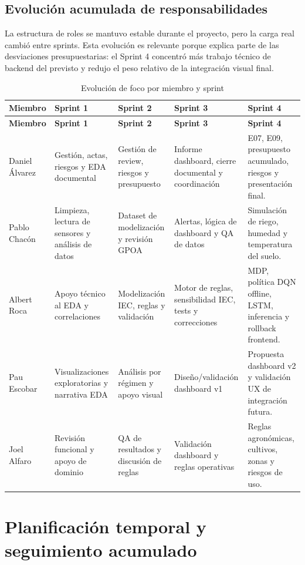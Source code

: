 \documentclass[11pt,a4paper]{article}
\begin{document}
\subsection{Evolución acumulada de responsabilidades}

La estructura de roles se mantuvo estable durante el proyecto, pero la carga real cambió entre sprints. Esta evolución es relevante porque explica parte de las desviaciones presupuestarias: el Sprint 4 concentró más trabajo técnico de backend del previsto y redujo el peso relativo de la integración visual final.

\begin{longtable}{p{}p{}p{}p{}p{}}
\caption{Evolución de foco por miembro y sprint}\\
\toprule
\textbf{Miembro} & \textbf{Sprint 1} & \textbf{Sprint 2} & \textbf{Sprint 3} & \textbf{Sprint 4} \\
\midrule
\endfirsthead
\toprule
\textbf{Miembro} & \textbf{Sprint 1} & \textbf{Sprint 2} & \textbf{Sprint 3} & \textbf{Sprint 4} \\
\midrule
\endhead
Daniel Álvarez & Gestión, actas, riesgos y EDA documental & Gestión de review, riesgos y presupuesto & Informe dashboard, cierre documental y coordinación & E07, E09, presupuesto acumulado, riesgos y presentación final. \\
Pablo Chacón & Limpieza, lectura de sensores y análisis de datos & Dataset de modelización y revisión GPOA & Alertas, lógica de dashboard y QA de datos & Simulación de riego, humedad y temperatura del suelo. \\
Albert Roca & Apoyo técnico al EDA y correlaciones & Modelización IEC, reglas y validación & Motor de reglas, sensibilidad IEC, tests y correcciones & MDP, política DQN offline, LSTM, inferencia y rollback frontend. \\
Pau Escobar & Visualizaciones exploratorias y narrativa EDA & Análisis por régimen y apoyo visual & Diseño/validación dashboard v1 & Propuesta dashboard v2 y validación UX de integración futura. \\
Joel Alfaro & Revisión funcional y apoyo de dominio & QA de resultados y discusión de reglas & Validación dashboard y reglas operativas & Reglas agronómicas, cultivos, zonas y riesgos de uso. \\
\bottomrule
\end{longtable}

\newpage

\section{Planificación temporal y seguimiento acumulado}
\end{document}
